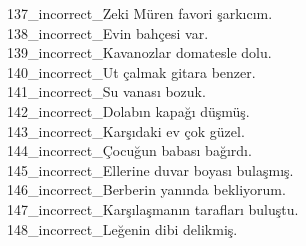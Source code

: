 \begin{myparindent}{0pt}
137\_incorrect\_Zeki Müren favori şarkıcım. \\
138\_incorrect\_Evin bahçesi var. \\
139\_incorrect\_Kavanozlar domatesle dolu. \\
140\_incorrect\_Ut çalmak gitara benzer. \\
141\_incorrect\_Su vanası bozuk. \\
142\_incorrect\_Dolabın kapağı düşmüş. \\
143\_incorrect\_Karşıdaki ev çok güzel. \\
144\_incorrect\_Çocuğun babası bağırdı. \\
145\_incorrect\_Ellerine duvar boyası bulaşmış. \\
146\_incorrect\_Berberin yanında bekliyorum. \\
147\_incorrect\_Karşılaşmanın tarafları buluştu. \\
148\_incorrect\_Leğenin dibi delikmiş. \\
\end{myparindent}